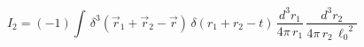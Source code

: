 \begin{equation}\label{rw3}
I_{2}=(-1)\int\, \delta^{3}\!\left({\vec{r}_{1} + \vec{r}_{2} -
\vec r}\right)\,\delta(r_{1}+r_{2}-t)\,\frac{d^{3}r_{1}}{4\pi\,r_{1}}\,
\frac{d^{3}r_{2}}{4\pi\,r_{2}\,{\ell_{0}}^{2}}
\end{equation}

